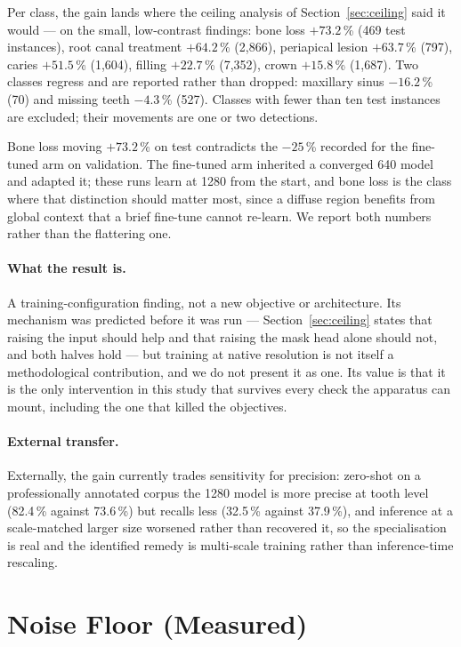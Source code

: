 \documentclass[11pt,letterpaper]{article}
\begin{document}
Per class, the gain lands where the ceiling analysis of
Section~\ref{sec:ceiling} said it would --- on the small, low-contrast
findings: bone loss $+73.2$\,\% (469 test instances), root canal treatment
$+64.2$\,\% (2{,}866), periapical lesion $+63.7$\,\% (797), caries
$+51.5$\,\% (1{,}604), filling $+22.7$\,\% (7{,}352), crown $+15.8$\,\%
(1{,}687). Two classes regress and are reported rather than dropped: maxillary
sinus $-16.2$\,\% (70) and missing teeth $-4.3$\,\% (527). Classes with fewer
than ten test instances are excluded; their movements are one or two
detections.

Bone loss moving $+73.2$\,\% on test contradicts the $-25$\,\% recorded for the
fine-tuned arm on validation. The fine-tuned arm inherited a converged 640
model and adapted it; these runs learn at 1280 from the start, and bone loss is
the class where that distinction should matter most, since a diffuse region
benefits from global context that a brief fine-tune cannot re-learn. We report
both numbers rather than the flattering one.

\paragraph{What the result is.} A training-configuration finding, not a new
objective or architecture. Its mechanism was predicted before it was run ---
Section~\ref{sec:ceiling} states that raising the input should help and that
raising the mask head alone should not, and both halves hold --- but training
at native resolution is not itself a methodological contribution, and we do
not present it as one. Its value is that it is the only intervention in this
study that survives every check the apparatus can mount, including the one
that killed the objectives.

\paragraph{External transfer.} Externally, the
gain currently trades sensitivity for precision: zero-shot on a professionally
annotated corpus the 1280 model is more precise at tooth level (82.4\,\%
against 73.6\,\%) but recalls less (32.5\,\% against 37.9\,\%), and inference
at a scale-matched larger size worsened rather than recovered it, so the
specialisation is real and the identified remedy is multi-scale training
rather than inference-time rescaling.

\section{Noise Floor (Measured)}
\end{document}
